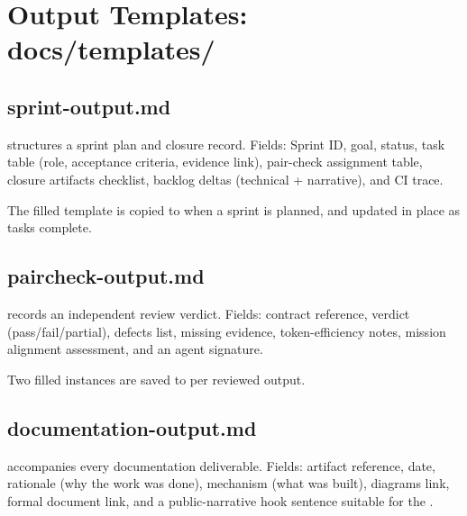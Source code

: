 \documentclass[a4paper,11pt,openany]{report}
\begin{document}


\chapter{Output Templates: docs/templates/}
\label{ch:templates}


\section{sprint-output.md}

 structures a sprint plan and closure
record. Fields: Sprint ID, goal, status, task table (role, acceptance criteria,
evidence link), pair-check assignment table, closure artifacts checklist,
backlog deltas (technical + narrative), and CI trace.

The filled template is copied to  when a sprint
is planned, and updated in place as tasks complete.

\section{paircheck-output.md}

 records an independent review
verdict. Fields: contract reference, verdict (pass/fail/partial), defects list,
missing evidence, token-efficiency notes, mission alignment assessment, and an
agent signature.

Two filled instances are saved to  per reviewed output.

\section{documentation-output.md}

 accompanies every documentation
deliverable. Fields: artifact reference, date, rationale (why the work was
done), mechanism (what was built), diagrams link, formal document link, and a
public-narrative hook sentence suitable for the .
\end{document}
